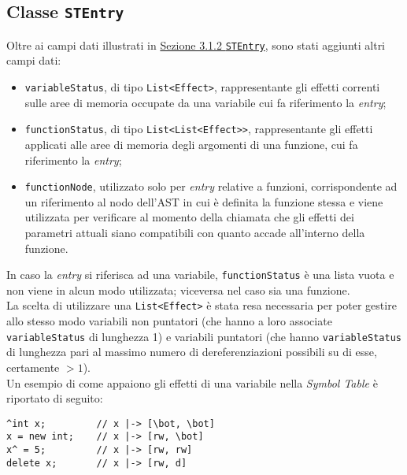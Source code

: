 \documentclass[../report.tex]{subfiles}
\begin{document}
\subsection[Classe STEntry]{Classe \texttt{STEntry}}\label{ss:stentry-effetti}
Oltre ai campi dati illustrati in \hyperref[ss:stentry]{Sezione 3.1.2 \texttt{STEntry}}, sono stati aggiunti altri campi dati:
\begin{itemize}
    \item \verb|variableStatus|, di tipo \verb|List<Effect>|, rappresentante gli effetti correnti sulle aree di memoria occupate da una variabile cui fa riferimento la \textit{entry};
    \item \verb|functionStatus|, di tipo \verb|List<List<Effect>>|, rappresentante gli effetti applicati alle aree di memoria degli argomenti di una funzione, cui fa riferimento la \textit{entry};
    \item \verb|functionNode|, utilizzato solo per \textit{entry} relative a funzioni, corrispondente ad un riferimento al nodo dell'AST in cui è definita la funzione stessa e viene utilizzata per verificare al momento della chiamata che gli effetti dei parametri attuali siano compatibili con quanto accade all'interno della funzione.
\end{itemize}
In caso la \textit{entry} si riferisca ad una variabile, \verb|functionStatus| è una lista vuota e non viene in alcun modo utilizzata; viceversa nel caso sia una funzione.\\
La scelta di utilizzare una \verb|List<Effect>| è stata resa necessaria per poter gestire allo stesso modo variabili non puntatori (che hanno a loro associate \verb|variableStatus| di lunghezza 1) e variabili puntatori (che hanno \verb|variableStatus| di lunghezza pari al massimo numero di dereferenziazioni possibili su di esse, certamente $> 1$).\\
Un esempio di come appaiono gli effetti di una variabile nella \textit{Symbol Table} \`e riportato di seguito:
\begin{lstlisting}
^int x;         // x |-> [\bot, \bot]
x = new int;    // x |-> [rw, \bot]
x^ = 5;         // x |-> [rw, rw]
delete x;       // x |-> [rw, d]
\end{lstlisting}
\end{document}
